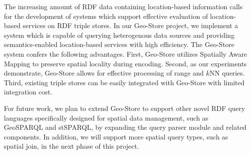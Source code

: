 The increasing amount of RDF data containing location-based information calls for the development of systems which support effective evaluation of location-based services on RDF triple stores. In our Geo-Store project, we implement a system which is capable of querying heterogenous data sources and providing semantics-enabled location-based services with high efficiency. The Geo-Store system confers the following advantages. First, Geo-Store utilizes Spatially Aware Mapping to preserve spatial locality during encoding. Second, as our experiments demonstrate, Geo-Store allows for effective processing of range and $k$NN queries. Third, existing triple stores can be easily integrated with Geo-Store with limited integration cost.

For future work, we plan to extend Geo-Store to support other novel RDF query languages specifically designed for spatial data management, such as GeoSPARQL and stSPARQL, by expanding the query parser module and related components. In addition, we will support more spatial query types, such as spatial join, in the next phase of this project.


